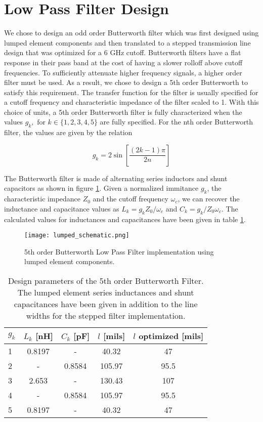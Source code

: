 \documentclass{article}
\begin{document}
\section*{Low Pass Filter Design}\label{sec:lpdesign}

We chose to design an odd order Butterworth filter which was first designed using lumped element components and then translated to a stepped transmission line design that was optimized for a 6 GHz cutoff. Butterworth filters have a flat response in their pass band at the cost of having a slower rolloff above cutoff frequencies. To sufficiently attenuate higher frequency signals, a higher order filter must be used. As a result, we chose to design a 5th order Butterworth to satisfy this requirement. The transfer function for the filter is usually specified for a cutoff frequency and characteristic impedance of the filter scaled to 1. With this choice of units, a 5th order Butterworth filter is fully characterized when the values $g_k, \textrm{ for } k \in \{1,2,3,4,5\}$ are fully specified. For the nth order Butterworth filter, the values are given by the relation

\begin{equation}
    g_k = 2 \sin \left[\frac{ (2 k - 1) \pi}{2 n} \right]
\end{equation}

The Butterworth filter is made of alternating series inductors and shunt capacitors as shown in figure \ref{fig:lumpedschematic}. Given a normalized immitance $g_k$, the characteristic impedance $Z_0$ and the cutoff frequency $\omega_c$, we can recover the inductance and capacitance values as $L_k = g_k Z_0/\omega_c$ and $C_k = g_k/Z_0 \omega_c$. The calculated values for inductances and capacitances have been given in table \ref{tab:parameters}.

\begin{figure}[!htbp]
    \centering
    \texttt{[image: lumped\_schematic.png]}
    \caption{5th order Butterworth Low Pass Filter implementation using lumped element components.}
    \label{fig:lumpedschematic}
\end{figure}

\begin{table}[!htbp]
\centering
\begin{tabular}{|l | c | c| c | c |}
    \hline
    $g_k$ & $L_k$ [nH] & $C_k$ [pF] & $l$ [mils] & $l$ optimized [mils] \\
    \hline
    1 & 0.8197 & - & 40.32 & 47 \\
    2 & - & 0.8584 & 105.97 & 95.5 \\
    3 & 2.653 & - & 130.43 & 107 \\
    4 & - & 0.8584 & 105.97 & 95.5 \\
    5 & 0.8197 & - & 40.32 & 47 \\
    \hline
\end{tabular}
    \caption{Design parameters of the 5th order Butterworth Filter. The lumped element series inductances and shunt capacitances have been given in addition to the line widths for the stepped filter implementation. }
    \label{tab:parameters}
\end{table}
\end{document}
